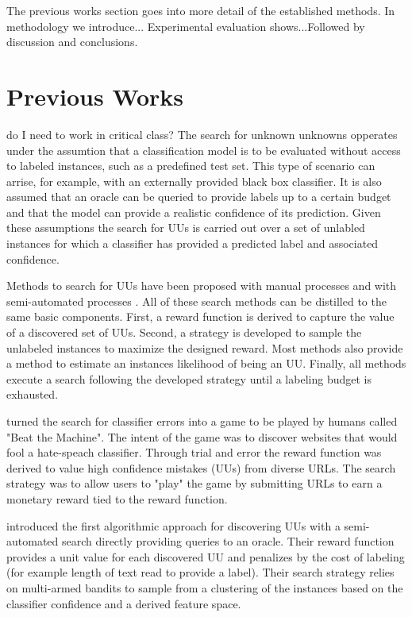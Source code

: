 \documentclass[letterpaper]{article} %
\newcommand{\wdb}[1]{{\color{blue} #1}} %
\begin{document}
\wdb{The previous works section goes into more detail of the established methods. In methodology we introduce... Experimental evaluation shows...Followed by discussion and conclusions.}

\section{Previous Works}

\wdb{do I need to work in critical class?}
The search for unknown unknowns opperates under the assumtion that a classification model is to be evaluated without access to labeled instances, such as a predefined test set. This type of scenario can arrise, for example, with an externally provided black box classifier.  It is also assumed that an oracle can be queried to provide labels up to a certain budget and that the model can provide a realistic confidence of its prediction.  Given these assumptions the search for UUs is carried out over a set of unlabled instances for which a classifier has provided a predicted label and associated confidence.  

Methods to search for UUs have been proposed with manual processes \citep{Attenberg2015} and with semi-automated processes \citep{Lakkaraju2016, Bansal2018}.  All of these search methods can be distilled to the same basic components.  First, a reward function is derived to capture the value of a discovered set of UUs. Second, a strategy is developed to sample the unlabeled instances to maximize the designed reward. Most methods also provide a method to estimate an instances likelihood of being an UU.  Finally, all methods execute a search following the developed strategy until a labeling budget is exhausted.

\citet{Attenberg2015} turned the search for classifier errors into a game to be played by humans called "Beat the Machine". The intent of the game was to discover websites that would fool a hate-speach classifier. Through trial and error the reward function was derived to value high confidence mistakes (UUs) from diverse URLs. The search strategy was to allow users to "play" the game by submitting URLs to earn a monetary reward tied to the reward function.   

\citet{Lakkaraju2016} introduced the first algorithmic approach for discovering UUs with a semi-automated search directly providing queries to an oracle.  Their reward function provides a unit value for each discovered UU and penalizes by the cost of labeling (for example length of text read to provide a label). Their search strategy relies on multi-armed bandits to sample from a clustering of the instances based on the classifier confidence and a derived feature space.
\end{document}
